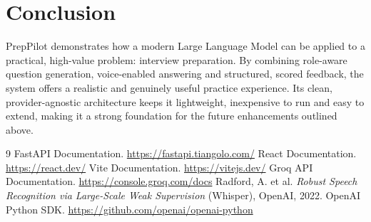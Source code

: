 \documentclass[11pt,a4paper]{article}
\begin{document}
\section{Conclusion}
PrepPilot demonstrates how a modern Large Language Model can be applied to a practical,
high-value problem: interview preparation. By combining role-aware question generation,
voice-enabled answering and structured, scored feedback, the system offers a realistic
and genuinely useful practice experience. Its clean, provider-agnostic architecture
keeps it lightweight, inexpensive to run and easy to extend, making it a strong
foundation for the future enhancements outlined above.

\begin{thebibliography}{9}
 FastAPI Documentation. \url{https://fastapi.tiangolo.com/}
 React Documentation. \url{https://react.dev/}
 Vite Documentation. \url{https://vitejs.dev/}
 Groq API Documentation. \url{https://console.groq.com/docs}
 Radford, A. et al. \textit{Robust Speech Recognition via Large-Scale
  Weak Supervision} (Whisper), OpenAI, 2022.
 OpenAI Python SDK. \url{https://github.com/openai/openai-python}
\end{thebibliography}
\end{document}
